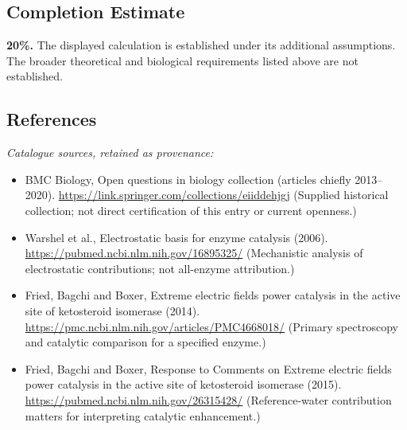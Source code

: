 \documentclass[11pt]{article}
\begin{document}
\subsection{Completion Estimate}
\textbf{20\%.} The displayed calculation is established under its additional assumptions. The broader theoretical and biological requirements listed above are not established.
\subsection{References}
\noindent\emph{Catalogue sources, retained as provenance:}
\begin{itemize}
\item BMC Biology, Open questions in biology collection (articles chiefly 2013--2020). \url{https://link.springer.com/collections/eiiddehjgj} (Supplied historical collection; not direct certification of this entry or current openness.)
\item Warshel et al., Electrostatic basis for enzyme catalysis (2006). \url{https://pubmed.ncbi.nlm.nih.gov/16895325/} (Mechanistic analysis of electrostatic contributions; not all-enzyme attribution.)
\item Fried, Bagchi and Boxer, Extreme electric fields power catalysis in the active site of ketosteroid isomerase (2014). \url{https://pmc.ncbi.nlm.nih.gov/articles/PMC4668018/} (Primary spectroscopy and catalytic comparison for a specified enzyme.)
\item Fried, Bagchi and Boxer, Response to Comments on Extreme electric fields power catalysis in the active site of ketosteroid isomerase (2015). \url{https://pubmed.ncbi.nlm.nih.gov/26315428/} (Reference-water contribution matters for interpreting catalytic enhancement.)
\end{itemize}
\clearpage


\appendix
\end{document}
